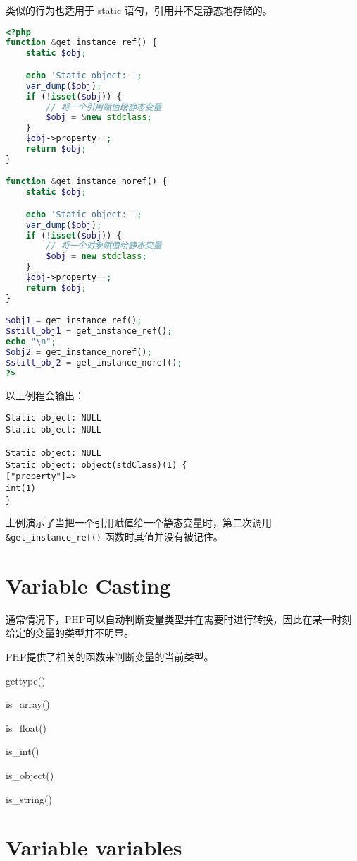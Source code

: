 类似的行为也适用于 static 语句，引用并不是静态地存储的。

\begin{lstlisting}[language=PHP]
<?php
function &get_instance_ref() {
    static $obj;

    echo 'Static object: ';
    var_dump($obj);
    if (!isset($obj)) {
        // 将一个引用赋值给静态变量
        $obj = &new stdclass;
    }
    $obj->property++;
    return $obj;
}

function &get_instance_noref() {
    static $obj;

    echo 'Static object: ';
    var_dump($obj);
    if (!isset($obj)) {
        // 将一个对象赋值给静态变量
        $obj = new stdclass;
    }
    $obj->property++;
    return $obj;
}

$obj1 = get_instance_ref();
$still_obj1 = get_instance_ref();
echo "\n";
$obj2 = get_instance_noref();
$still_obj2 = get_instance_noref();
?>
\end{lstlisting}

以上例程会输出：

\begin{verbatim}
Static object: NULL
Static object: NULL

Static object: NULL
Static object: object(stdClass)(1) {
["property"]=>
int(1)
}
\end{verbatim}

上例演示了当把一个引用赋值给一个静态变量时，第二次调用 \texttt{\&get\_instance\_ref()} 函数时其值并没有被记住。

\section{Variable Casting}

通常情况下，PHP可以自动判断变量类型并在需要时进行转换，因此在某一时刻给定的变量的类型并不明显。

PHP提供了相关的函数来判断变量的当前类型。

\begin{compactitem}
\item gettype()
\item is\_array()
\item is\_float()
\item is\_int()
\item is\_object()
\item is\_string()
\end{compactitem}



\section{Variable variables}


